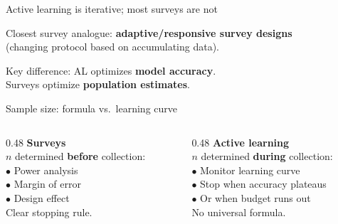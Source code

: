 \documentclass[aspectratio=169,11pt]{beamer}
\begin{document}
\begin{frame}{Active learning is iterative; most surveys are not}

\begin{center}
\end{center}

\vspace{1em}

Closest survey analogue: \textbf{adaptive/responsive survey designs}\\
(changing protocol based on accumulating data).

\vspace{1em}

Key difference: AL optimizes \textbf{model accuracy}.\\
Surveys optimize \textbf{population estimates}.
\end{frame}

\begin{frame}{Sample size: formula vs.\ learning curve}

\begin{columns}[T]
\begin{column}{0.48\textwidth}
\textbf{Surveys}\\[0.5em]
$n$ determined \textbf{before} collection:\\[0.3em]
$\bullet$ Power analysis\\
$\bullet$ Margin of error\\
$\bullet$ Design effect\\[0.3em]
Clear stopping rule.
\end{column}

\begin{column}{0.48\textwidth}
\textbf{Active learning}\\[0.5em]
$n$ determined \textbf{during} collection:\\[0.3em]
$\bullet$ Monitor learning curve\\
$\bullet$ Stop when accuracy plateaus\\
$\bullet$ Or when budget runs out\\[0.3em]
No universal formula.
\end{column}
\end{columns}
\end{frame}
\end{document}
